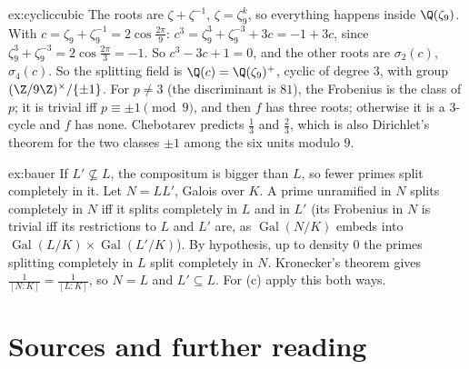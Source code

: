 \begin{solution}{ex:cycliccubic}
\idea The roots are $\zeta+\zeta^{-1}$, $\zeta=\zeta_9^k$, so everything happens inside $\Q(\zeta_9)$.
\writeup With $c=\zeta_9+\zeta_9^{-1}=2\cos\frac{2\pi}9$: $c^3=\zeta_9^3+\zeta_9^{-3}+3c=-1+3c$, since $\zeta_9^3+\zeta_9^{-3}=2\cos\frac{2\pi}3=-1$. So
$c^3-3c+1=0$, and the other roots are $\sigma_2(c)$, $\sigma_4(c)$. So the splitting field is $\Q(c)=\Q(\zeta_9)^+$, cyclic of degree $3$, with group
$(\Z/9\Z)^\times/\{\pm1\}$. For $p\ne3$ (the discriminant is $81$), the Frobenius is the class of $p$; it is trivial iff $p\equiv\pm1\pmod9$, and then $f$
has three roots; otherwise it is a $3$-cycle and $f$ has none. Chebotarev predicts $\frac13$ and $\frac23$, which is also Dirichlet's theorem for the
two classes $\pm1$ among the six units modulo $9$.
\end{solution}

\begin{solution}{ex:bauer}
\idea If $L'\not\subseteq L$, the compositum is bigger than $L$, so fewer primes split completely in it.
\writeup Let $N=LL'$, Galois over $K$. A prime unramified in $N$ splits completely in $N$ iff it splits completely in $L$ and in $L'$ (its Frobenius in
$N$ is trivial iff its restrictions to $L$ and $L'$ are, as $\operatorname{Gal}(N/K)$ embeds into $\operatorname{Gal}(L/K)\times
\operatorname{Gal}(L'/K)$). By hypothesis, up to density $0$ the primes splitting completely in $L$ split completely in $N$. Kronecker's theorem gives
$\frac1{[N:K]}=\frac1{[L:K]}$, so $N=L$ and $L'\subseteq L$. For (c) apply this both ways.
\end{solution}

\section*{Sources and further reading}


